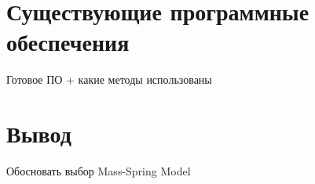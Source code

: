 
\section{Существующие программные обеспечения}

Готовое ПО + какие методы использованы

\section{Вывод}

Обосновать выбор Mass-Spring Model
